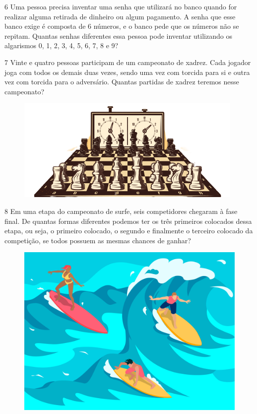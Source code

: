 
\num{6} Uma pessoa precisa inventar uma senha que utilizará no banco quando for
realizar alguma retirada de dinheiro ou algum pagamento. A senha que esse
banco exige é composta de 6 números, e o banco pede que os números
não se repitam. Quantas senhas diferentes essa pessoa pode inventar
utilizando os algarismos 0, 1, 2, 3, 4, 5, 6, 7, 8 e 9?


\num{7} Vinte e quatro pessoas participam de um campeonato de xadrez. Cada jogador joga com todos os demais duas vezes, sendo uma vez com
torcida para si e outra vez com torcida para o adversário. Quantas partidas
de xadrez teremos nesse campeonato?

\begin{figure}[htpb!]
\centering
\includegraphics[width=.6\textwidth]{media/image73a.png}
\end{figure}


\num{8} Em uma etapa do campeonato de surfe, seis competidores chegaram à fase
final. De quantas formas diferentes podemos ter os três primeiros
colocados dessa etapa, ou seja, o primeiro colocado, o segundo e
finalmente o terceiro colocado da competição, se todos
possuem as mesmas chances de ganhar?

\begin{figure}[htpb!]
\centering
\includegraphics[width=.6\textwidth]{media/image73b.jpeg}
\end{figure}

